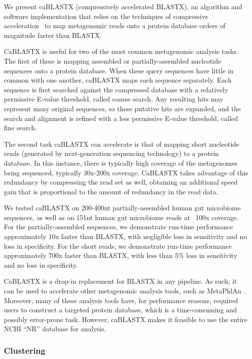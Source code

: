 \documentclass[review,preprint,12pt]{elsarticle}
\renewcommand{\cite}{\citep} %
\theoremstyle{definition}
\theoremstyle{remark}
\numberwithin{equation}{section}
\begin{document}
We present caBLASTX (compressively accelerated BLASTX), an algorithm and 
software implementation that relies on the techniques of compressive 
acceleration~\cite{Loh, Daniels} to map metagenomic reads onto a protein 
database orders of magnitude faster than BLASTX.

CaBLASTX is useful for two of the most common metagenomic analysis tasks. 
The first of these is mapping assembled or partially-assembled
nucleotide sequences onto a protein database. 
When these query sequences have
little in common with one another, caBLASTX maps each sequence separately. 
Each sequence is first searched against the compressed database with a 
relatively permissive E-value threshold, called coarse search. 
Any resulting hits may represent many original sequences, so these putative 
hits are expanded, and the search and alignment is refined with a less 
permissive E-value threshold, called fine search.

The second task caBLASTX can accelerate is that of mapping short nucleotide
reads (generated by next-generation sequencing technology) to a protein
database. In this instance, there is typically high coverage of the metagenomes
being sequenced, typically 30x-200x coverage. CaBLASTX takes advantage of this
redundancy
by compressing the read set as well, obtaining an additional speed gain that is
proportional to the amount of redundancy in the read data.


We tested caBLASTX on 200-400nt partially-assembled human gut microbiome
sequences, as well as on 151nt human gut microbiome reads at ~100x coverage.
For the partially-assembled sequences, we demonstrate run-time performance
approximately 10x faster than BLASTX, with negligible loss in sensitivity and
no loss in specificity. For the short reads, we demonstrate run-time
performance approximately 700x faster than BLASTX, with less than 5\% loss in
sensitivity and no loss in specificity.

CaBLASTX is a drop-in replacement for BLASTX in any pipeline.
As such, it can be used to accelerate other metagenomic analysis tools, such
as MetaPhlAn~\cite{blah}.
Moreover, many of these analysis tools have, for performance reasons, required
users to construct a targeted protein database, which is a time-consuming and
possibly error-prone task.
However, caBLASTX makes it feasible to use the entire NCBI ``NR'' database for
analysis.

\subsubsection{Clustering}
\end{document}
